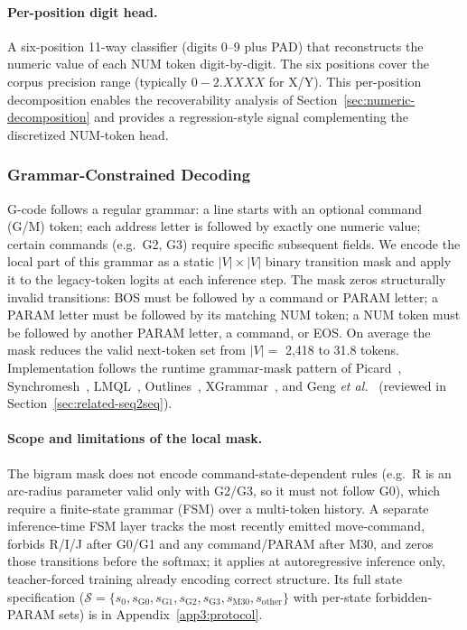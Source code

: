 \documentclass[sensors,article,submit,moreauthors,pdftex]{Definitions/mdpi}
\newcommand{\etal}{\textit{et al.}}
\begin{document}
\paragraph{Per-position digit head.} A six-position 11-way classifier (digits 0--9 plus PAD) that reconstructs the numeric value of each NUM token digit-by-digit. The six positions cover the corpus precision range (typically $0\!-\!2\!.X\!X\!X\!X$ for X/Y). This per-position decomposition enables the recoverability analysis of Section~\ref{sec:numeric-decomposition} and provides a regression-style signal complementing the discretized NUM-token head.

\subsubsection{Grammar-Constrained Decoding}
\label{sec:grammar}

G-code follows a regular grammar: a line starts with an optional command (G/M) token; each address letter is followed by exactly one numeric value; certain commands (e.g.\ G2, G3) require specific subsequent fields. We encode the local part of this grammar as a static $|V| \times |V|$ binary transition mask and apply it to the legacy-token logits at each inference step. The mask zeros structurally invalid transitions: BOS must be followed by a command or PARAM letter; a PARAM letter must be followed by its matching NUM token; a NUM token must be followed by another PARAM letter, a command, or EOS. On average the mask reduces the valid next-token set from $|V|=$ 2{,}418 to 31.8 tokens. Implementation follows the runtime grammar-mask pattern of Picard~\cite{picard}, Synchromesh~\cite{synchromesh}, LMQL~\cite{lmql}, Outlines~\cite{outlines}, XGrammar~\cite{xgrammar}, and Geng \etal~\cite{geng2023gcd} (reviewed in Section~\ref{sec:related-seq2seq}).

\paragraph{Scope and limitations of the local mask.} The bigram mask does not encode command-state-dependent rules (e.g.\ R is an arc-radius parameter valid only with G2/G3, so it must not follow G0), which require a finite-state grammar (FSM) over a multi-token history. A separate inference-time FSM layer tracks the most recently emitted move-command, forbids R/I/J after G0/G1 and any command/PARAM after M30, and zeros those transitions before the softmax; it applies at autoregressive inference only, teacher-forced training already encoding correct structure. Its full state specification ($\mathcal{S}=\{s_0,s_{\text{G0}},s_{\text{G1}},s_{\text{G2}},s_{\text{G3}},s_{\text{M30}},s_{\text{other}}\}$ with per-state forbidden-PARAM sets) is in Appendix~\ref{app3:protocol}.
\end{document}
